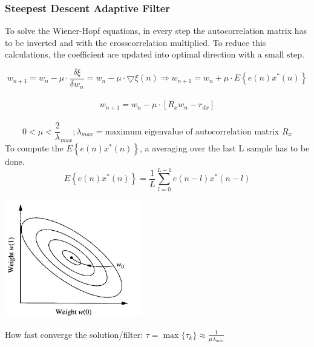 \subsubsection{Steepest Descent Adaptive Filter }
To solve the Wiener-Hopf equations, in every step the autocorrelation matrix has to be inverted and with the crosscorrelation multiplied. 
To reduce this calculations, the coefficient are updated into optimal direction with a small step.
\begin{minipage}{13cm}
$$w_{n+1}=w_n-\mu \cdot  \dfrac{\delta \xi}{\delta w_n} =w_n-\mu \cdot \bigtriangledown\xi(n) \Rightarrow \boxed{ w_{n+1}= w_n+\mu \cdot E\left\lbrace e(n)x^*(n)\right\rbrace}$$ \\
																											$$ \boxed{	w_{n+1}= w_n - \mu \cdot [R_x w_n - r_{dx} ]   }$$ \\
$$ 0<\mu< \frac 2 \lambda_{max}; \lambda_{max} = \text{maximum eigenvalue of autocorrelation matrix } R_x$$
To compute the $E\left\lbrace e(n)x^*(n)\right\rbrace$, a averaging over the last L sample has to be done.  
$$E\left\lbrace e(n)x^*(n)\right\rbrace= \frac{1}{L}\sum\limits_{l=0}^{L-1}e(n-l)x^*(n-l)$$
\end{minipage}
\begin{minipage}{6cm}
        \includegraphics[width=6cm]{../TSM_StatDig/bilder/steepestDescent.jpg}
\end{minipage}

 How fast converge the solution/filter: $\displaystyle \tau=\max\{\tau_k\}\approx\frac{1}{\mu \lambda_{min}} $


\clearpage
